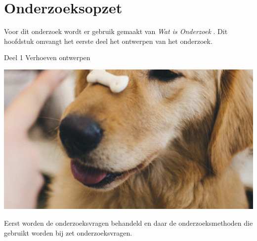 \chapter{Onderzoeksopzet}
Voor dit onderzoek wordt er gebruik gemaakt van \textit{Wat is Onderzoek} \Parencite{Verhoeven}.
Dit hoofdstuk omvangt het eerste deel het ontwerpen van het onderzoek.\\

\begin{graphic}
	\vspace{0.2cm}
	\captionsetup{type=figure}
	\caption{Deel 1 Verhoeven ontwerpen}
	\includegraphics[scale=0.2]{img/Placeholder.jpg}
	\label{fig:Deel1Verhoeven}
	\vspace{0.2cm}
\end{graphic}

\whitespace
Eerst worden de onderzoeksvragen behandeld en daar de onderzoeksmethoden die gebruikt worden bij zet onderzoeksvragen.



